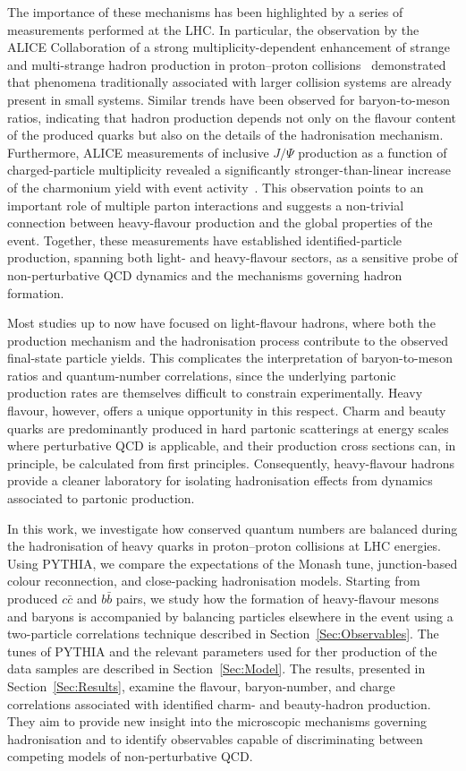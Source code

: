 The importance of these mechanisms has been highlighted by a series of measurements performed at the LHC. In particular, the observation by the ALICE Collaboration of a strong multiplicity-dependent enhancement of strange and multi-strange hadron production in proton--proton collisions~\cite{ALICE:2016fzo} demonstrated that phenomena traditionally associated with larger collision systems are already present in small systems. Similar trends have been observed for baryon-to-meson ratios, indicating that hadron production depends not only on the flavour content of the produced quarks but also on the details of the hadronisation mechanism. Furthermore, ALICE measurements of inclusive $J/\Psi$ production as a function of charged-particle multiplicity revealed a significantly stronger-than-linear increase of the charmonium yield with event activity~\cite{ALICE:2012pet,ALICE:2021zkd}. This observation points to an important role of multiple parton interactions and suggests a non-trivial connection between heavy-flavour production and the global properties of the event. Together, these measurements have established identified-particle production, spanning both light- and heavy-flavour sectors, as a sensitive probe of non-perturbative QCD dynamics and the mechanisms governing hadron formation.

Most studies up to now have focused on light-flavour hadrons, where both the production mechanism and the hadronisation process contribute to the observed final-state particle yields. This complicates the interpretation of baryon-to-meson ratios and quantum-number correlations, since the underlying partonic production rates are themselves difficult to constrain experimentally. Heavy flavour, however, offers a unique opportunity in this respect. Charm and beauty quarks are predominantly produced in hard partonic scatterings at energy scales where perturbative QCD is applicable, and their production cross sections can, in principle, be calculated from first principles. Consequently, heavy-flavour hadrons provide a cleaner laboratory for isolating hadronisation effects from dynamics associated to partonic production.

In this work, we investigate how conserved quantum numbers are balanced during the hadronisation of heavy quarks in proton--proton collisions at LHC energies. Using PYTHIA, we compare the expectations of the Monash tune, junction-based colour reconnection, and close-packing hadronisation models. Starting from produced $c\bar{c}$ and $b\bar{b}$ pairs, we study how the formation of heavy-flavour mesons and baryons is accompanied by balancing particles elsewhere in the event using a two-particle correlations technique described in Section~\ref{Sec:Observables}. The tunes of PYTHIA and the relevant parameters used for ther production of the data samples are described in Section~\ref{Sec:Model}. The results, presented in Section~\ref{Sec:Results}, examine the flavour, baryon-number, and charge correlations associated with identified charm- and beauty-hadron production. They aim to provide new insight into the microscopic mechanisms governing hadronisation and to identify observables capable of discriminating between competing models of non-perturbative QCD.